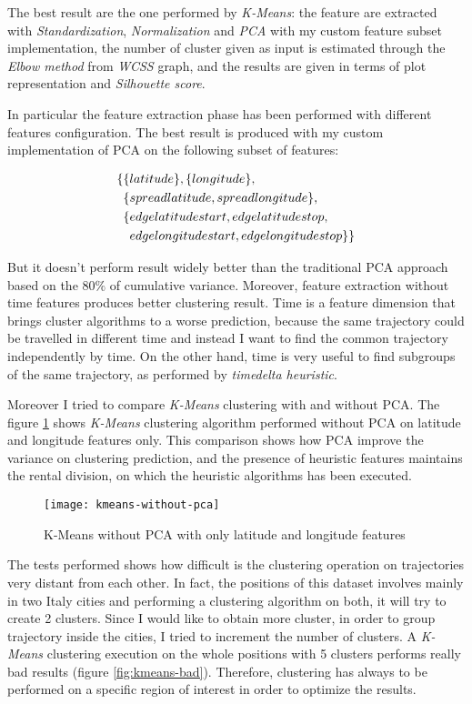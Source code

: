 The best result are the one performed by \textit{K-Means}: the feature are extracted with \textit{Standardization}, \textit{Normalization} and \textit{PCA} with my custom feature subset implementation, the number of cluster given as input is estimated through the \textit{Elbow method} from \textit{WCSS} graph, and the results are given in terms of plot representation and \textit{Silhouette score}. 

In particular the feature extraction phase has been performed with different features configuration. The best result is produced with my custom implementation of PCA on the following subset of features: 

\begin{align}
\{ &\{ latitude\} , \{longitude\}, \notag\\
 &\{spread\-latitude, spread\-longitude\}, \notag\\
 &\{edge\-latitude\-start, edge\-latitude\-stop, \notag\\ 
 &\phantom{\{}edge\-longitude\-start, edge\-longitude\-stop\} \}\notag
\end{align} 

But it doesn't perform result widely better than the traditional PCA approach based on the $80\%$ of cumulative variance. Moreover, feature extraction without time features produces better clustering result. Time is a feature dimension that brings cluster algorithms to a worse prediction, because the same trajectory could be travelled in different time and instead I want to find the common trajectory independently by time. On the other hand, time is very useful to find subgroups of the same trajectory, as performed by \textit{timedelta heuristic}.

Moreover I tried to compare \textit{K-Means} clustering with and without PCA. The figure \ref{fig:kmeans-without-pca} shows \textit{K-Means} clustering algorithm performed without PCA on latitude and longitude features only. This comparison shows how PCA improve the variance on clustering prediction, and the presence of heuristic features maintains the rental division, on which the heuristic algorithms has been executed.  

\begin{figure}[bt]
	\centering
	\texttt{[image: kmeans-without-pca]}
	\caption{K-Means without PCA with only latitude and longitude features}
	\label{fig:kmeans-without-pca}
\end{figure}

The tests performed shows how difficult is the clustering operation on trajectories very distant from each other. In fact, the positions of this dataset involves mainly in two Italy cities and performing a clustering algorithm on both, it will try to create 2 clusters. Since I would like to obtain more cluster, in order to group trajectory inside the cities, I tried to increment the number of clusters. A \textit{K-Means} clustering execution on the whole positions with 5 clusters performs really bad results (figure \ref{fig:kmeans-bad}). Therefore, clustering has always to be performed on a specific region of interest in order to optimize the results.

